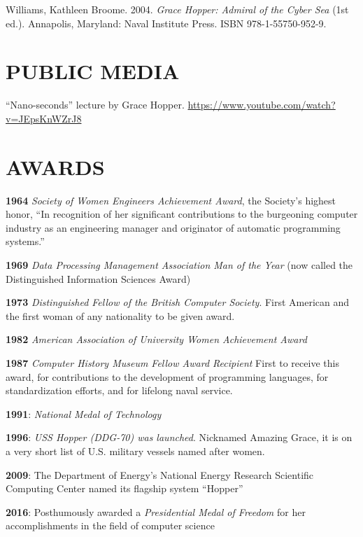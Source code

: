 \documentclass[10pt,]{article}
\begin{document}
Williams, Kathleen Broome. 2004. \emph{Grace Hopper: Admiral of the
Cyber Sea} (1st ed.). Annapolis, Maryland: Naval Institute Press. ISBN
978-1-55750-952-9.

\section{PUBLIC MEDIA}\label{public-media}

``Nano-seconds'' lecture by Grace Hopper.
\url{https://www.youtube.com/watch?v=JEpsKnWZrJ8}

\section{AWARDS}\label{awards}

\textbf{1964} \emph{Society of Women Engineers Achievement Award}, the
Society's highest honor, ``In recognition of her significant
contributions to the burgeoning computer industry as an engineering
manager and originator of automatic programming systems.''

\textbf{1969} \emph{Data Processing Management Association Man of the
Year} (now called the Distinguished Information Sciences Award)

\textbf{1973} \emph{Distinguished Fellow of the British Computer
Society}. First American and the first woman of any nationality to be
given award.

\textbf{1982} \emph{American Association of University Women Achievement
Award}

\textbf{1987} \emph{Computer History Museum Fellow Award Recipient}
First to receive this award, for contributions to the development of
programming languages, for standardization efforts, and for lifelong
naval service.

\textbf{1991}: \emph{National Medal of Technology}

\textbf{1996}: \emph{USS Hopper (DDG-70) was launched}. Nicknamed
Amazing Grace, it is on a very short list of U.S. military vessels named
after women.

\textbf{2009}: The Department of Energy's National Energy Research
Scientific Computing Center named its flagship system ``Hopper''

\textbf{2016}: Posthumously awarded a \emph{Presidential Medal of
Freedom} for her accomplishments in the field of computer science
\end{document}
